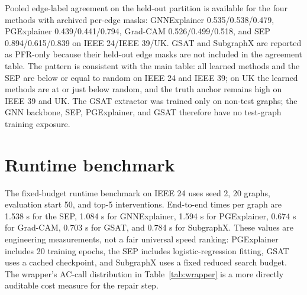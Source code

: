 \begin{table}[!htbp]
\centering
\caption{Held-out backbone audit on the exact GIN random-test partition (seed 2). All evaluated graphs are outside the GIN training set and outside the SEP/PGExplainer/GSAT training sets. PFR is the restricted AC screening pass rate. The held-out partition contains 363, 16, and 225 explainable-positive graphs on IEEE 24, IEEE 39, and UK; the table uses 50, 16, and 50 of them.}
\label{tab:heldout_random}
\scriptsize
{}
\begin{flushleft}
\footnotesize
Pooled edge-label agreement on the held-out partition is available for the four methods with archived per-edge masks: GNNExplainer 0.535/0.538/0.479, PGExplainer 0.439/0.441/0.794, Grad-CAM 0.526/0.499/0.518, and SEP 0.894/0.615/0.839 on IEEE 24/IEEE 39/UK. GSAT and SubgraphX are reported as PFR-only because their held-out edge masks are not included in the agreement table. The pattern is consistent with the main table: all learned methods and the SEP are below or equal to random on IEEE 24 and IEEE 39; on UK the learned methods are at or just below random, and the truth anchor remains high on IEEE 39 and UK. The GSAT extractor was trained only on non-test graphs; the GNN backbone, SEP, PGExplainer, and GSAT therefore have no test-graph training exposure.
\end{flushleft}
\end{table}

\section{Runtime benchmark}\label{appendix:runtime}
\setcounter{table}{0}

The fixed-budget runtime benchmark on IEEE 24 uses seed 2, 20 graphs, evaluation start 50, and top-5 interventions. End-to-end times per graph are 1.538 s for the SEP, 1.084 s for GNNExplainer, 1.594 s for PGExplainer, 0.674 s for Grad-CAM, 0.703 s for GSAT, and 0.784 s for SubgraphX. These values are engineering measurements, not a fair universal speed ranking: PGExplainer includes 20 training epochs, the SEP includes logistic-regression fitting, GSAT uses a cached checkpoint, and SubgraphX uses a fixed reduced search budget. The wrapper's AC-call distribution in Table~\ref{tab:wrapper} is a more directly auditable cost measure for the repair step.

